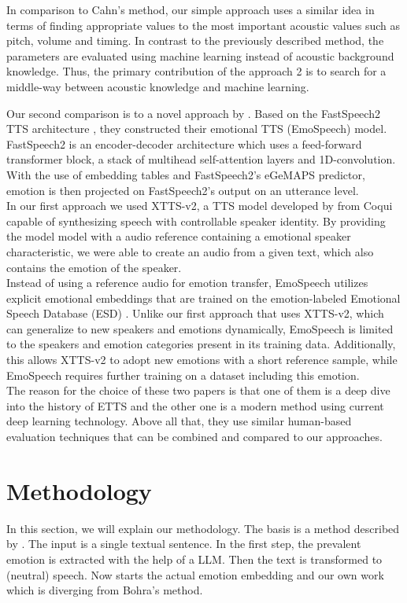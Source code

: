 \documentclass[11pt]{article}
\begin{document}
In comparison to Cahn's method, our simple approach uses a similar idea in terms of finding appropriate values to the most important acoustic values such as pitch, volume and timing. In contrast to the previously described method, the parameters are evaluated using machine learning instead of acoustic background knowledge. Thus, the primary contribution of the approach 2 is to search for a middle-way between acoustic knowledge and machine learning.

Our second comparison is to a novel approach by \cite{diatlova_emospeech_2023}. Based on the FastSpeech2 TTS architecture \cite{ren2020fastspeech}, they constructed their emotional TTS (EmoSpeech) model. FastSpeech2 is an encoder-decoder architecture which uses a feed-forward transformer block, a stack of multihead self-attention layers and 1D-convolution. With the use of embedding tables and FastSpeech2's eGeMAPS predictor, emotion is then projected on FastSpeech2's output on an utterance level. \\
In our first approach we used XTTS-v2, a TTS model developed by \cite{casanova2024xtts} from Coqui capable of synthesizing speech with controllable speaker identity. By providing the model model with a audio reference containing a emotional speaker characteristic, we were able to create an audio from a given text, which also contains the emotion of the speaker. \\
Instead of using a reference audio for emotion transfer, EmoSpeech utilizes explicit emotional embeddings that are trained on the emotion-labeled Emotional Speech Database (ESD) \cite{zhou2022emotional}. Unlike our first approach that uses XTTS-v2, which can generalize to new speakers and emotions dynamically, EmoSpeech is limited to the speakers and emotion categories present in its training data. Additionally, this allows XTTS-v2 to adopt new emotions with a short reference sample, while EmoSpeech requires further training on a dataset including this emotion.   
\\

The reason for the choice of these two papers is that one of them is a deep dive into the history of ETTS and the other one is a modern method using current deep learning technology. Above all that, they use similar human-based evaluation techniques that can be combined and compared to our approaches.

\section{Methodology}
\label{methodology}
In this section, we will explain our methodology. The basis is a method described by \cite{bohra_smart_2022}. The input is a single textual sentence. In the first step, the prevalent emotion is extracted with the help of a LLM. Then the text is transformed to (neutral) speech. Now starts the actual emotion embedding and our own work which is diverging from Bohra's method.
\end{document}
